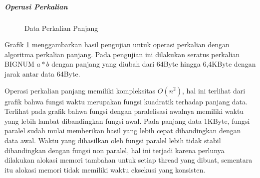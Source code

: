     \subparagraph{Operasi Perkalian}
    \begin{figure}[h]
      \centering
      \caption{Data Perkalian Panjang}
      \label{fig:data_mul}
    \end{figure}

    Grafik \ref{fig:data_mul} menggambarkan hasil pengujian untuk operasi perkalian dengan algoritma perkalian panjang. Pada pengujian ini dilakukan seratus perkalian BIGNUM $a * b$ dengan panjang yang diubah dari 64Byte hingga 6,4KByte dengan jarak antar data 64Byte.

    Operasi perkalian panjang memiliki kompleksitas $O(n^2)$, hal ini terlihat dari grafik bahwa fungsi waktu merupakan fungsi kuadratik terhadap panjang data. Terlihat pada grafik bahwa fungsi dengan paralelisasi awalnya memiliki waktu yang lebih lambat dibandingkan fungsi awal. Pada panjang data 1KByte, fungsi paralel sudah mulai memberikan hasil yang lebih cepat dibandingkan dengan data awal. Waktu yang dihasilkan oleh fungsi paralel lebih tidak stabil dibandingkan dengan fungsi non paralel, hal ini terjadi karena perlunya dilakukan alokasi memori tambahan untuk setiap thread yang dibuat, sementara itu alokasi memori tidak memiliki waktu eksekusi yang konsisten.

